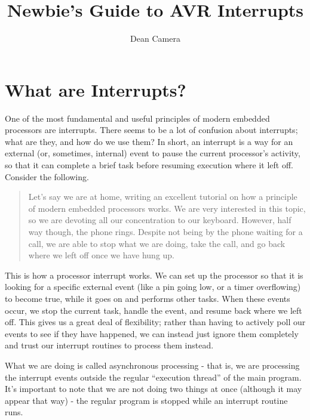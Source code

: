 \documentclass[a4paper,oneside,notitlepage]{book}
\begin{document}
\title{Newbie's Guide to AVR Interrupts}
\author{Dean Camera}

\maketitle

\tableofcontents
\cleardoublepage


\label{chp:WhatAreInts}
\chapter{What are Interrupts?}

One of the most fundamental and useful principles of modern embedded processors are interrupts. There seems to be a lot of confusion about interrupts; what are they, and how do we use them? In short, an interrupt is a way for an external (or, sometimes, internal) event to pause the current processor's activity, so that it can complete a brief task before resuming execution where it left off. Consider the following.

\begin{quote}
Let's say we are at home, writing an excellent tutorial on how a principle of modern embedded processors works. We are very interested in this topic, so we are devoting all our concentration to our keyboard. However, half way though, the phone rings. Despite not being by the phone waiting for a call, we are able to stop what we are doing, take the call, and go back where we left off once we have hung up.
\end{quote}

This is how a processor interrupt works. We can set up the processor so that it is looking for a specific external event (like a pin going low, or a timer overflowing) to become true, while it goes on and performs other tasks. When these events occur, we stop the current task, handle the event, and resume back where we left off. This gives us a great deal of flexibility; rather than having to actively poll our events to see if they have happened, we can instead just ignore them completely and trust our interrupt routines to process them instead.

What we are doing is called asynchronous processing - that is, we are processing the interrupt events outside the regular ``execution thread'' of the main program. It's important to note that we are not doing two things at once (although it may appear that way) - the regular program is stopped while an interrupt routine runs.
\end{document}
